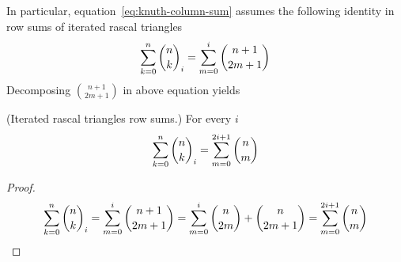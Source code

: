 In particular, equation~\eqref{eq:knuth-column-sum} assumes the following identity in
row sums of iterated rascal triangles
\begin{align*}
    \sum_{k=0}^n \binom{n}{k}_{i} = \sum_{m=0}^{i} \binom{n+1}{2m+1}
\end{align*}
Decomposing $\binom{n+1}{2m+1}$ in above equation yields
\begin{proposition} (Iterated rascal triangles row sums.)
    For every $i$
    \begin{align*}
        \sum_{k=0}^{n} \binom{n}{k}_{i} = \sum_{m=0}^{2i+1} \binom{n}{m}
    \end{align*}
    \begin{proof}
        \begin{align*}
            \sum_{k=0}^n \binom{n}{k}_{i} = \sum_{m=0}^{i} \binom{n+1}{2m+1} = \sum_{m=0}^{i} \binom{n}{2m} + \binom{n}{2m+1} = \sum_{m=0}^{2i+1} \binom{n}{m}
        \end{align*}
    \end{proof}
\end{proposition}
